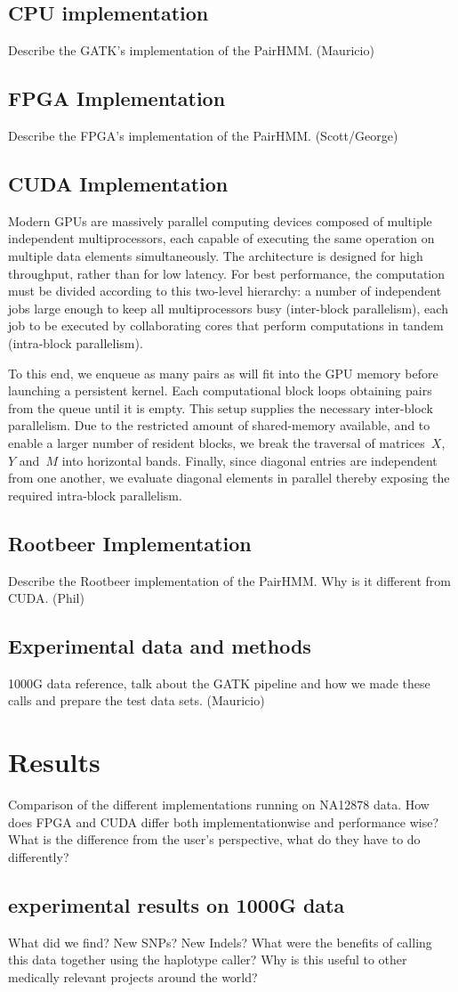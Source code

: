 \documentclass[11pt, oneside]{article}
\begin{document}
	\subsection{CPU implementation}
	Describe the GATK's implementation of the PairHMM. (Mauricio)
	\subsection{FPGA Implementation}
	Describe the FPGA's implementation of the PairHMM. (Scott/George)
	\subsection{CUDA Implementation}
Modern GPUs are massively parallel computing devices
composed of multiple independent multiprocessors, each
capable of executing the same operation on multiple data
elements simultaneously. The architecture is designed for
high throughput, rather than for low latency.  For best
performance, the computation must be divided according to
this two-level hierarchy: a number of independent jobs large
enough to keep all multiprocessors busy (inter-block
parallelism), each job to be executed by collaborating cores 
that perform computations in tandem (intra-block
parallelism).

To this end, we enqueue as many pairs as will fit into the
GPU memory before launching a persistent kernel.  Each
computational block loops obtaining pairs from the queue
until it is empty. This setup supplies the necessary
inter-block parallelism.  Due to the restricted amount of
shared-memory available, and to enable a larger number of
resident blocks, we break the traversal of matrices~$X$, $Y$
and~$M$ into horizontal bands. Finally, since diagonal
entries are independent from one another, we evaluate
diagonal elements in parallel thereby exposing the required
intra-block parallelism. 


	\subsection{Rootbeer Implementation}
	Describe the Rootbeer implementation of the PairHMM. Why is it different from CUDA. (Phil)
	\subsection{Experimental data and methods}
	1000G data reference, talk about the GATK pipeline and how we made these calls and prepare the test data sets. (Mauricio)
	\section{Results}
	Comparison of the different implementations running on NA12878 data.
	How does FPGA and CUDA differ both implementationwise and performance wise? 
	What is the difference from the user's perspective, what do they have to do differently?
	\subsection{experimental results on 1000G data}
	What did we find? New SNPs? New Indels? 
	What were the benefits of calling this data together using the haplotype caller?
	Why is this useful to other medically relevant projects around the world? 
\end{document}
